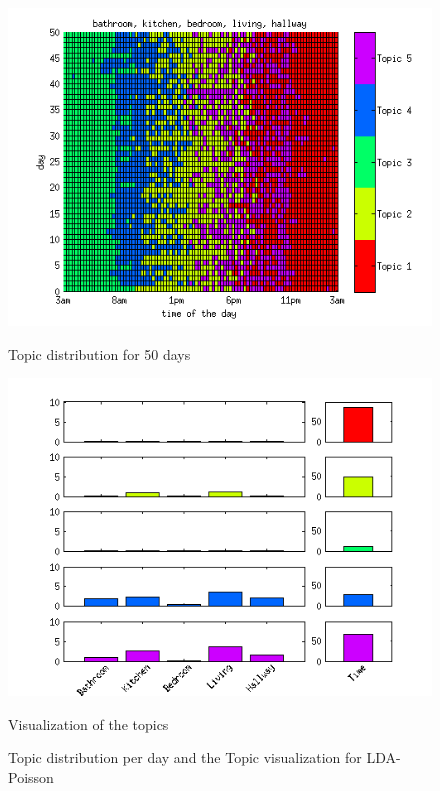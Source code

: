 \begin{figure}
 \centering
 \begin{minipage}[b]{0.45\linewidth}
  \centering
  \includegraphics[width=\textwidth]{Pictures/TopDayHN3TS96k5Pois.png}
  \caption{Topic distribution for 50 days}
  \label{fig:PoisDay96}
 \end{minipage}
 \begin{minipage}[b]{0.45\linewidth}
  \centering
  \includegraphics[width=\textwidth]{Pictures/TopVisuHN3TS96k5Pois.png}
  \caption{Visualization of the topics}
  \label{fig:PoisTopVisu96}
 \end{minipage}
 \caption{Topic distribution per day and the Topic visualization for LDA-Poisson}
 \label{fig:Pois96}
\end{figure}


